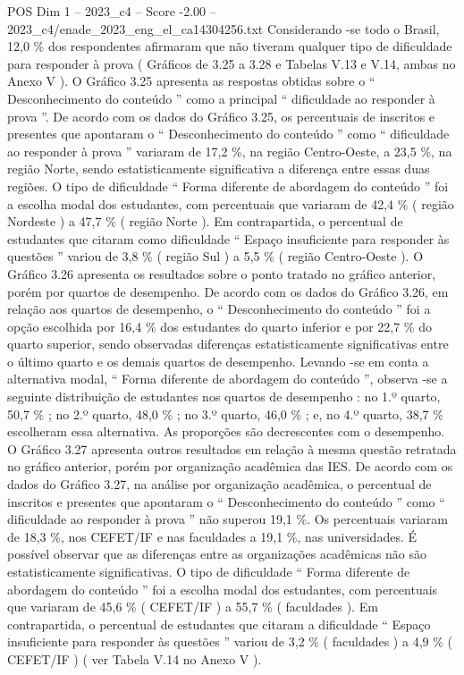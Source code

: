 \begin{textsample}{POS Dim 1 – 2023\_c4 – Score -2.00 – 2023\_c4/enade\_2023\_eng\_el\_ca14304256.txt}
Considerando -se todo o Brasil, 12,0 \% dos respondentes afirmaram que não tiveram qualquer tipo de dificuldade para responder à prova ( Gráficos de 3.25 a 3.28 e Tabelas V.13 e V.14, ambas no Anexo V ).
O Gráfico 3.25 apresenta as respostas obtidas sobre o “ Desconhecimento do conteúdo ” como a principal “ dificuldade ao responder à prova ”.
De acordo com os dados do Gráfico 3.25, os percentuais de inscritos e presentes que apontaram o “ Desconhecimento do conteúdo ” como “ dificuldade ao responder à prova ” variaram de 17,2 \%, na região Centro-Oeste, a 23,5 \%, na região Norte, sendo estatisticamente significativa a diferença entre essas duas regiões.
O tipo de dificuldade “ Forma diferente de abordagem do conteúdo ” foi a escolha modal dos estudantes, com percentuais que variaram de 42,4 \% ( região Nordeste ) a 47,7 \% ( região Norte ).
Em contrapartida, o percentual de estudantes que citaram como dificuldade “ Espaço insuficiente para responder às questões ” variou de 3,8 \% ( região Sul ) a 5,5 \% ( região Centro-Oeste ).
O Gráfico 3.26 apresenta os resultados sobre o ponto tratado no gráfico anterior, porém por quartos de desempenho.
De acordo com os dados do Gráfico 3.26, em relação aos quartos de desempenho, o “ Desconhecimento do conteúdo ” foi a opção escolhida por 16,4 \% dos estudantes do quarto inferior e por 22,7 \% do quarto superior, sendo observadas diferenças estatisticamente significativas entre o último quarto e os demais quartos de desempenho.
Levando -se em conta a alternativa modal, “ Forma diferente de abordagem do conteúdo ”, observa -se a seguinte distribuição de estudantes nos quartos de desempenho : no 1.º quarto, 50,7 \% ; no 2.º quarto, 48,0 \% ; no 3.º quarto, 46,0 \% ; e, no 4.º quarto, 38,7 \% escolheram essa alternativa.
As proporções são decrescentes com o desempenho.
O Gráfico 3.27 apresenta outros resultados em relação à mesma questão retratada no gráfico anterior, porém por organização acadêmica das IES.
De acordo com os dados do Gráfico 3.27, na análise por organização acadêmica, o percentual de inscritos e presentes que apontaram o “ Desconhecimento do conteúdo ” como “ dificuldade ao responder à prova ” não superou 19,1 \%.
Os percentuais variaram de 18,3 \%, nos CEFET/IF e nas faculdades a 19,1 \%, nas universidades.
É possível observar que as diferenças entre as organizações acadêmicas não são estatisticamente significativas.
O tipo de dificuldade “ Forma diferente de abordagem do conteúdo ” foi a escolha modal dos estudantes, com percentuais que variaram de 45,6 \% ( CEFET/IF ) a 55,7 \% ( faculdades ).
Em contrapartida, o percentual de estudantes que citaram a dificuldade “ Espaço insuficiente para responder às questões ” variou de 3,2 \% ( faculdades ) a 4,9 \% ( CEFET/IF ) ( ver Tabela V.14 no Anexo V ).

\end{textsample}
